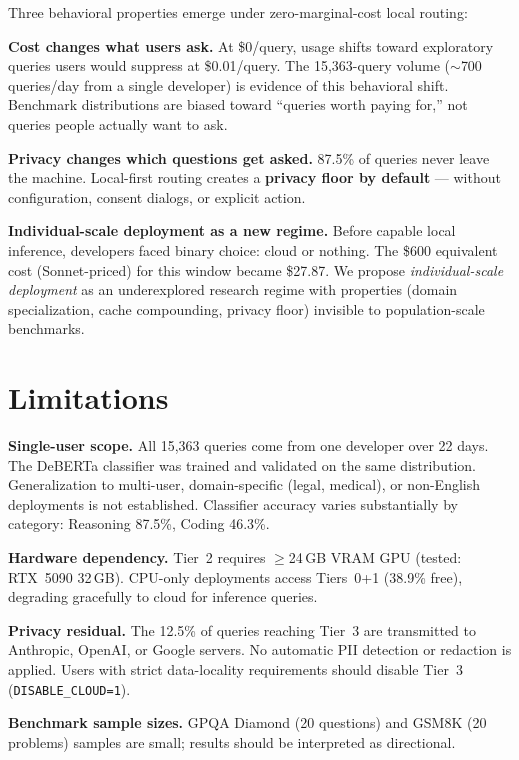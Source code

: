 \documentclass[11pt]{article}
\begin{document}
Three behavioral properties emerge under zero-marginal-cost local
routing:

\textbf{Cost changes what users ask.} At \$0/query, usage shifts toward
exploratory queries users would suppress at \$0.01/query. The
15,363-query volume ($\sim$700 queries/day from a single developer) is
evidence of this behavioral shift. Benchmark distributions are biased
toward ``queries worth paying for,'' not queries people actually want to
ask.

\textbf{Privacy changes which questions get asked.} 87.5\% of queries
never leave the machine. Local-first routing creates a \textbf{privacy
floor by default} --- without configuration, consent dialogs, or
explicit action.

\textbf{Individual-scale deployment as a new regime.} Before capable
local inference, developers faced binary choice: cloud or nothing. The
\$600 equivalent cost (Sonnet-priced) for this window became \$27.87.
We propose \textit{individual-scale deployment} as an underexplored
research regime with properties (domain specialization, cache
compounding, privacy floor) invisible to population-scale benchmarks.

\section*{Limitations}
\label{sec:limitations}

\textbf{Single-user scope.} All 15,363 queries come from one developer
over 22 days. The DeBERTa classifier was trained and validated on the
same distribution. Generalization to multi-user, domain-specific
(legal, medical), or non-English deployments is not established.
Classifier accuracy varies substantially by category: Reasoning 87.5\%,
Coding 46.3\%.

\textbf{Hardware dependency.} Tier~2 requires $\geq$24\,GB VRAM GPU
(tested: RTX~5090 32\,GB). CPU-only deployments access Tiers~0+1
(38.9\% free), degrading gracefully to cloud for inference queries.

\textbf{Privacy residual.} The 12.5\% of queries reaching Tier~3 are
transmitted to Anthropic, OpenAI, or Google servers. No automatic PII
detection or redaction is applied. Users with strict data-locality
requirements should disable Tier~3 (\texttt{DISABLE\_CLOUD=1}).

\textbf{Benchmark sample sizes.} GPQA Diamond (20 questions) and GSM8K
(20 problems) samples are small; results should be interpreted as
directional.
\end{document}
